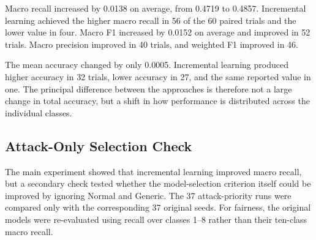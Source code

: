 \documentclass[conference]{IEEEtran}
\begin{document}
Macro recall increased by 0.0138 on average, from 0.4719 to 0.4857. Incremental learning achieved the higher macro recall in 56 of the 60 paired trials and the lower value in four. Macro F1 increased by 0.0152 on average and improved in 52 trials. Macro precision improved in 40 trials, and weighted F1 improved in 46.

The mean accuracy changed by only 0.0005. Incremental learning produced higher accuracy in 32 trials, lower accuracy in 27, and the same reported value in one. The principal difference between the approaches is therefore not a large change in total accuracy, but a shift in how performance is distributed across the individual classes.

\subsection{Attack-Only Selection Check}

The main experiment showed that incremental learning improved macro recall, but a secondary check tested whether the model-selection criterion itself could be improved by ignoring Normal and Generic. The 37 attack-priority runs were compared only with the corresponding 37 original seeds. For fairness, the original models were re-evaluated using recall over classes 1--8 rather than their ten-class macro recall.

\begin{table}[H]
    \centering
    \caption{Recall comparison for the original and attack-priority experiments. Values in parentheses are changes from the corresponding matched original model.}
    \label{tab:attack_selection}
    \scriptsize
\end{table}
\end{document}
